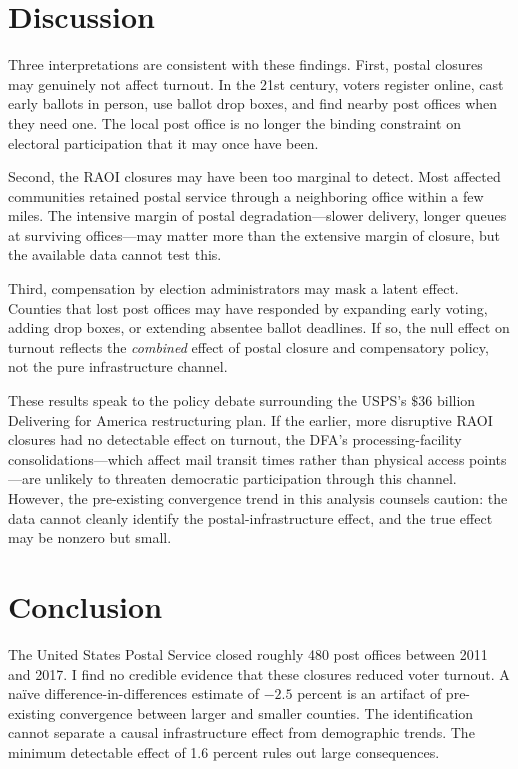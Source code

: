 \documentclass[12pt]{article}
\begin{document}
\section{Discussion}

Three interpretations are consistent with these findings. First, postal closures may genuinely not affect turnout. In the 21st century, voters register online, cast early ballots in person, use ballot drop boxes, and find nearby post offices when they need one. The local post office is no longer the binding constraint on electoral participation that it may once have been.

Second, the RAOI closures may have been too marginal to detect. Most affected communities retained postal service through a neighboring office within a few miles. The intensive margin of postal degradation---slower delivery, longer queues at surviving offices---may matter more than the extensive margin of closure, but the available data cannot test this.

Third, compensation by election administrators may mask a latent effect. Counties that lost post offices may have responded by expanding early voting, adding drop boxes, or extending absentee ballot deadlines. If so, the null effect on turnout reflects the \emph{combined} effect of postal closure and compensatory policy, not the pure infrastructure channel.

These results speak to the policy debate surrounding the USPS's $\$$36 billion Delivering for America restructuring plan. If the earlier, more disruptive RAOI closures had no detectable effect on turnout, the DFA's processing-facility consolidations---which affect mail transit times rather than physical access points---are unlikely to threaten democratic participation through this channel. However, the pre-existing convergence trend in this analysis counsels caution: the data cannot cleanly identify the postal-infrastructure effect, and the true effect may be nonzero but small.


\section{Conclusion}

The United States Postal Service closed roughly 480 post offices between 2011 and 2017. I find no credible evidence that these closures reduced voter turnout. A na\"ive difference-in-differences estimate of $-2.5$ percent is an artifact of pre-existing convergence between larger and smaller counties. The identification cannot separate a causal infrastructure effect from demographic trends. The minimum detectable effect of 1.6 percent rules out large consequences.
\end{document}
